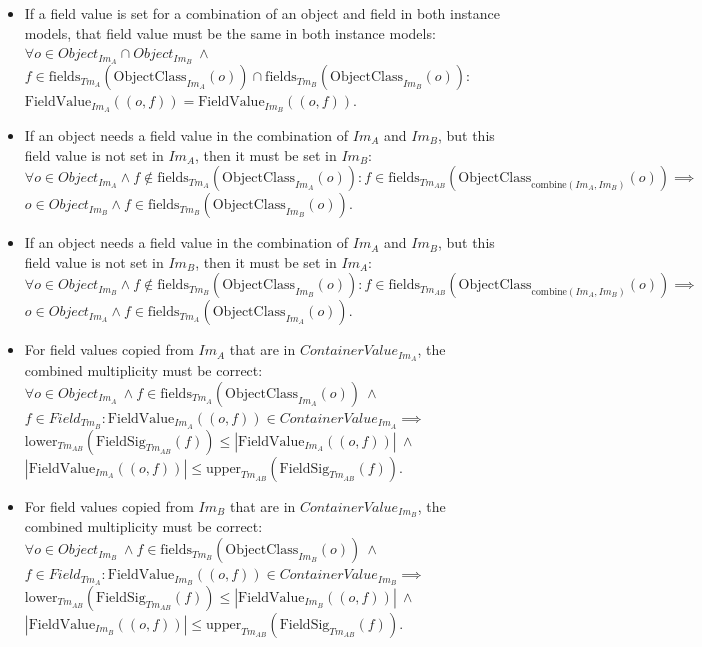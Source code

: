 \begin{thm}
\begin{itemize}
    \item If a field value is set for a combination of an object and field in both instance models, that field value must be the same in both instance models: $\forall o \in Object_{Im_A} \cap Object_{Im_B}\ \land$\\$f \in \mathrm{fields}_{Tm_A}(\mathrm{ObjectClass}_{Im_A}(o)) \cap \mathrm{fields}_{Tm_B}(\mathrm{ObjectClass}_{Im_B}(o))\!:$\\$\mathrm{FieldValue}_{Im_A}(( o, f )) = \mathrm{FieldValue}_{Im_B}(( o, f ))$.
    \item If an object needs a field value in the combination of $Im_A$ and $Im_B$, but this field value is not set in $Im_A$, then it must be set in $Im_B$:
    $\forall o \in Object_{Im_A} \land f \not\in \mathrm{fields}_{Tm_A}(\mathrm{ObjectClass}_{Im_A}(o))\!:
    f \in \mathrm{fields}_{Tm_{AB}}(\mathrm{ObjectClass}_{\mathrm{combine}(Im_A, Im_B)}(o)) \implies$\\$
    o \in Object_{Im_B} \land f \in \mathrm{fields}_{Tm_B}(\mathrm{ObjectClass}_{Im_B}(o))$.
    \item If an object needs a field value in the combination of $Im_A$ and $Im_B$, but this field value is not set in $Im_B$, then it must be set in $Im_A$:
    $\forall o \in Object_{Im_B} \land f \not\in \mathrm{fields}_{Tm_B}(\mathrm{ObjectClass}_{Im_B}(o))\!:
    f \in \mathrm{fields}_{Tm_{AB}}(\mathrm{ObjectClass}_{\mathrm{combine}(Im_A, Im_B)}(o)) \implies$\\$
    o \in Object_{Im_A} \land f \in \mathrm{fields}_{Tm_A}(\mathrm{ObjectClass}_{Im_A}(o))$.
    \item For field values copied from $Im_A$ that are in $ContainerValue_{Im_A}$, the combined multiplicity must be correct: $\forall o \in Object_{Im_A}\ \land f \in \mathrm{fields}_{Tm_A}(\mathrm{ObjectClass}_{Im_A}(o))\ \land$\\$f \in Field_{Tm_B}\!: \mathrm{FieldValue}_{Im_A}(( o, f )) \in ContainerValue_{Im_A} \implies$\\$\mathrm{lower}_{Tm_{AB}}(\mathrm{FieldSig}_{Tm_{AB}}(f)) \leq |\mathrm{FieldValue}_{Im_A}(( o, f ))|\ \land$\\$|\mathrm{FieldValue}_{Im_A}(( o, f ))| \leq \mathrm{upper}_{Tm_{AB}}(\mathrm{FieldSig}_{Tm_{AB}}(f))$.
    \item For field values copied from $Im_B$ that are in $ContainerValue_{Im_B}$, the combined multiplicity must be correct: $\forall o \in Object_{Im_B}\ \land f \in \mathrm{fields}_{Tm_B}(\mathrm{ObjectClass}_{Im_B}(o))\ \land$\\$f \in Field_{Tm_A}\!: \mathrm{FieldValue}_{Im_B}(( o, f )) \in ContainerValue_{Im_B} \implies$\\$\mathrm{lower}_{Tm_{AB}}(\mathrm{FieldSig}_{Tm_{AB}}(f)) \leq |\mathrm{FieldValue}_{Im_B}(( o, f ))|\ \land$\\$|\mathrm{FieldValue}_{Im_B}(( o, f ))| \leq \mathrm{upper}_{Tm_{AB}}(\mathrm{FieldSig}_{Tm_{AB}}(f))$.

\end{itemize}
\end{thm}
